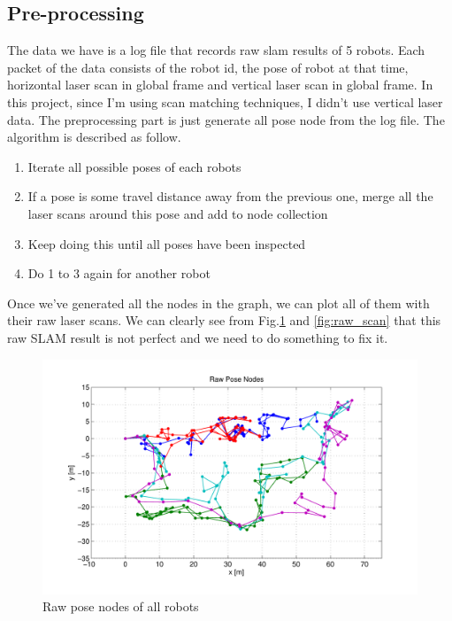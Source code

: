 \documentclass[twoside]{article}
\begin{document}
\begin{multicols}{2}
\section{Pre-processing}
The data we have is a log file that records raw slam results of 5 robots. Each packet of the data consists of the robot id, the pose of robot at that time, horizontal laser scan in global frame and vertical laser scan in global frame.
In this project, since I'm using scan matching techniques, I didn't use vertical laser data. The preprocessing part is just generate all pose node from the log file. The algorithm is described as follow.
\begin{enumerate}
\item Iterate all possible poses of each robots
\item If a pose is some travel distance away from the previous one, merge all the laser scans around this pose and add to node collection
\item Keep doing this until all poses have been inspected
\item Do 1 to 3 again for another robot
\end{enumerate}
Once we've generated all the nodes in the graph, we can plot all of them with their raw laser scans. We can clearly see from Fig.\ref{fig:raw_node} and \ref{fig:raw_scan} that this raw SLAM result is not perfect and we need to do something to fix it.
\begin{figure}[H]
\centering
\includegraphics[width=\columnwidth]{fig/raw_node.pdf}
\caption{Raw pose nodes of all robots}
\label{fig:raw_node}
\end{figure}
\begin{figure}[H]
\centering

\end{figure}
\end{multicols}
\end{document}
